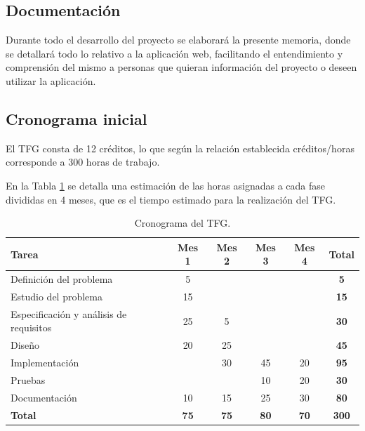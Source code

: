\vspace{-0.3cm}

\subsection{Documentación}
\vspace{-0.05cm}
Durante todo el desarrollo del proyecto se elaborará la presente memoria, donde se detallará todo lo relativo a la aplicación web, facilitando el entendimiento y comprensión del mismo a personas que quieran información del proyecto o deseen utilizar la aplicación.

\vspace{-0.3cm}

\subsection{Cronograma inicial}
\vspace{-0.05cm}
El TFG consta de 12 créditos, lo que según la relación establecida créditos/horas corresponde a 300 horas de trabajo. 

En la Tabla \ref{tab:cronograma} se detalla una estimación de las horas asignadas a cada fase divididas en 4 meses, que es el tiempo estimado para la realización del TFG.

\begin{table}[h!]
    \centering
    \begin{tabular}{|l|c|c|c|c|c|}
        \hline
        \textbf{Tarea} & \textbf{Mes 1} & \textbf{Mes 2} & \textbf{Mes 3} & \textbf{Mes 4} & \textbf{Total} \\
        \hline
        Definición del problema & 5 & & & & \textbf{5} \\
        \hline
        Estudio del problema & 15 & & & & \textbf{15} \\
        \hline
        Especificación y análisis de requisitos & 25 & 5 & & & \textbf{30} \\
        \hline
        Diseño & 20 & 25 & & & \textbf{45} \\
        \hline
        Implementación & & 30 & 45 & 20 & \textbf{95} \\
        \hline
        Pruebas & & & 10 & 20 & \textbf{30} \\
        \hline
        Documentación & 10 & 15 & 25 & 30 & \textbf{80} \\
        \hline
        \textbf{Total} & \textbf{75} & \textbf{75} & \textbf{80} & \textbf{70} & \textbf{300} \\
        \hline
    \end{tabular}
    \caption{Cronograma del TFG.}
    \label{tab:cronograma}
\end{table}